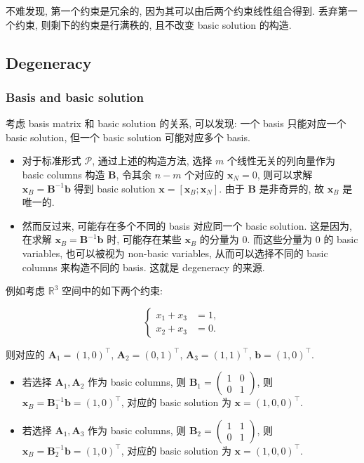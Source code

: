 \documentclass[11pt,UTF8,scheme=plain,fontset=fandol,linespread=1.3]{ctexart}
\numberwithin{figure}{section}
\begin{document}
不难发现, 第一个约束是冗余的, 因为其可以由后两个约束线性组合得到. 丢弃第一个约束, 则剩下的约束是行满秩的, 且不改变 basic solution 的构造.

\subsection{Degeneracy}

\subsubsection{Basis and basic solution}

考虑 basis matrix 和 basic solution 的关系, 可以发现: 一个 basis 只能对应一个 basic solution, 但一个 basic solution 可能对应多个 basis.

\begin{itemize}
\item {}对于标准形式 $\mathcal{P}$, 通过上述的构造方法, 选择 $m$ 个线性无关的列向量作为 basic columns 构造 $\bm{B}$, 令其余 $n-m$ 个对应的 $\bm{x}_N = 0$, 则可以求解 $\bm{x}_B = \bm{B}^{-1}\bm{b}$ 得到 basic solution $\bm{x} = [\bm{x}_B; \bm{x}_N]$. 由于 $\bm{B}$ 是非奇异的, 故 $\bm{x}_B$ 是唯一的.


\item {}然而反过来, 可能存在多个不同的 basis 对应同一个 basic solution. 这是因为, 在求解 $\bm{x}_B = \bm{B}^{-1}\bm{b}$ 时, 可能存在某些 $\bm{x}_B$ 的分量为 $0$. 而这些分量为 $0$ 的 basic variables, 也可以被视为 non-basic variables, 从而可以选择不同的 basic columns 来构造不同的 basis. 这就是 degeneracy 的来源.


\end{itemize}

例如考虑 $\mathbb{R}^3$ 空间中的如下两个约束:

\[
\begin{cases}
  x_1 + x_3 &= 1,\\
  x_2 + x_3 &= 0.
\end{cases}
\]

则对应的 $\bm{A}_1 = (1, 0)^\top$, $\bm{A}_2 = (0, 1)^\top$, $\bm{A}_3 = (1, 1)^\top$, $\bm{b} = (1, 0)^\top$.

\begin{itemize}
\item {}若选择 $\bm{A}_1, \bm{A}_2$ 作为 basic columns, 则 $\bm{B}_1 = \begin{pmatrix} 1 & 0 \\ 0 & 1 \end{pmatrix}$, 则 $\bm{x}_B = \bm{B}_1^{-1} \bm{b} = (1, 0)^\top$, 对应的 basic solution 为 $\bm{x} = (1, 0, 0)^\top$.


\item {}若选择 $\bm{A}_1, \bm{A}_3$ 作为 basic columns, 则 $\bm{B}_2 = \begin{pmatrix} 1 & 1 \\ 0 & 1 \end{pmatrix}$, 则 $\bm{x}_B = \bm{B}_2^{-1} \bm{b} = (1, 0)^\top$, 对应的 basic solution 为 $\bm{x} = (1, 0, 0)^\top$.


\end{itemize}
\end{document}
